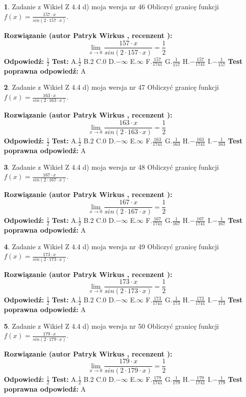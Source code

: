 \documentclass[12pt, a4paper]{article}
\theoremstyle{definition} %
\newtheorem{zad}{}
\newcommand{\zadStart}[1]{\begin{zad}#1\newline}
\newcommand{\zadStop}{\end{zad}}
\newcommand{\rozwStart}[2]{\noindent \textbf{Rozwiązanie (autor #1 , recenzent #2): }\newline}
\newcommand{\rozwStop}{\newline}
\newcommand{\odpStart}{\noindent \textbf{Odpowiedź:}\newline}
\newcommand{\odpStop}{\newline}
\newcommand{\testStart}{\noindent \textbf{Test:}\newline}
\newcommand{\testStop}{\newline}
\newcommand{\kluczStart}{\noindent \textbf{Test poprawna odpowiedź:}\newline}
\newcommand{\kluczStop}{\newline}
\begin{document}
\zadStart{Zadanie z Wikieł Z 4.4 d) moja wersja nr 46}
Obliczyć granicę funkcji $f(x)=\frac{157\cdot x}{sin(2 \cdot157\cdot x)}$.
\zadStop
\rozwStart{Patryk Wirkus}{}
$$\lim\limits_{x\to 0}\frac{157\cdot x}{sin(2 \cdot157\cdot x)}=\frac{1}{2}$$
\rozwStop
\odpStart
$\frac{1}{2}$
\odpStop
\testStart
A.$\frac{1}{2}$
B.$2$
C.$0$
D.$-\infty$
E.$\infty$
F.$\frac{157}{1741}$
G.$\frac{1}{157}$
H.$-\frac{157}{1741}$
I.$-\frac{1}{157}$
\testStop
\kluczStart
A
\kluczStop



\zadStart{Zadanie z Wikieł Z 4.4 d) moja wersja nr 47}
Obliczyć granicę funkcji $f(x)=\frac{163\cdot x}{sin(2 \cdot163\cdot x)}$.
\zadStop
\rozwStart{Patryk Wirkus}{}
$$\lim\limits_{x\to 0}\frac{163\cdot x}{sin(2 \cdot163\cdot x)}=\frac{1}{2}$$
\rozwStop
\odpStart
$\frac{1}{2}$
\odpStop
\testStart
A.$\frac{1}{2}$
B.$2$
C.$0$
D.$-\infty$
E.$\infty$
F.$\frac{163}{1741}$
G.$\frac{1}{163}$
H.$-\frac{163}{1741}$
I.$-\frac{1}{163}$
\testStop
\kluczStart
A
\kluczStop



\zadStart{Zadanie z Wikieł Z 4.4 d) moja wersja nr 48}
Obliczyć granicę funkcji $f(x)=\frac{167\cdot x}{sin(2 \cdot167\cdot x)}$.
\zadStop
\rozwStart{Patryk Wirkus}{}
$$\lim\limits_{x\to 0}\frac{167\cdot x}{sin(2 \cdot167\cdot x)}=\frac{1}{2}$$
\rozwStop
\odpStart
$\frac{1}{2}$
\odpStop
\testStart
A.$\frac{1}{2}$
B.$2$
C.$0$
D.$-\infty$
E.$\infty$
F.$\frac{167}{1741}$
G.$\frac{1}{167}$
H.$-\frac{167}{1741}$
I.$-\frac{1}{167}$
\testStop
\kluczStart
A
\kluczStop



\zadStart{Zadanie z Wikieł Z 4.4 d) moja wersja nr 49}
Obliczyć granicę funkcji $f(x)=\frac{173\cdot x}{sin(2 \cdot173\cdot x)}$.
\zadStop
\rozwStart{Patryk Wirkus}{}
$$\lim\limits_{x\to 0}\frac{173\cdot x}{sin(2 \cdot173\cdot x)}=\frac{1}{2}$$
\rozwStop
\odpStart
$\frac{1}{2}$
\odpStop
\testStart
A.$\frac{1}{2}$
B.$2$
C.$0$
D.$-\infty$
E.$\infty$
F.$\frac{173}{1741}$
G.$\frac{1}{173}$
H.$-\frac{173}{1741}$
I.$-\frac{1}{173}$
\testStop
\kluczStart
A
\kluczStop



\zadStart{Zadanie z Wikieł Z 4.4 d) moja wersja nr 50}
Obliczyć granicę funkcji $f(x)=\frac{179\cdot x}{sin(2 \cdot179\cdot x)}$.
\zadStop
\rozwStart{Patryk Wirkus}{}
$$\lim\limits_{x\to 0}\frac{179\cdot x}{sin(2 \cdot179\cdot x)}=\frac{1}{2}$$
\rozwStop
\odpStart
$\frac{1}{2}$
\odpStop
\testStart
A.$\frac{1}{2}$
B.$2$
C.$0$
D.$-\infty$
E.$\infty$
F.$\frac{179}{1741}$
G.$\frac{1}{179}$
H.$-\frac{179}{1741}$
I.$-\frac{1}{179}$
\testStop
\kluczStart
A
\kluczStop
\end{document}

